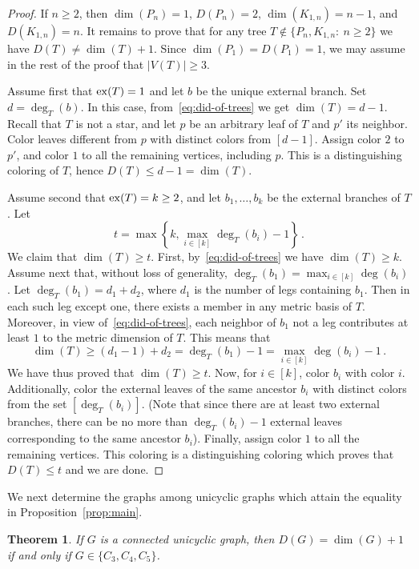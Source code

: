 \documentclass[12pt]{article}
\newtheorem{theorem}{Theorem}[section]
\DeclareMathOperator {\ex} {{\rm ex}}
\begin{document}
\begin{proof}
If $n\ge 2$, then $\dim(P_n) = 1$, $D(P_n) = 2$, $\dim(K_{1,n}) = n-1$, and $D(K_{1,n}) = n$. It remains to prove that for any tree $T \notin\{P_n, K_{1,n}:\ n\ge 2\}$ we have $D(T) \ne \dim(T)+1$. Since $\dim(P_1) = D(P_1) = 1$, we may assume in the rest of the proof that $|V(T)|\ge 3$. 

Assume first that $\ex(T) = 1$ and let $b$ be the unique external branch. Set $d = \deg_T(b)$. In this case, from~\eqref{eq:did-of-trees} we get $\dim(T) = d-1$. Recall that $T$ is not a star, and let $p$ be an arbitrary leaf of $T$ and $p'$ its neighbor. Color leaves different from $p$ with distinct colors from $[d-1]$. Assign color $2$ to $p'$, and color $1$ to all the remaining vertices, including $p$. This is a distinguishing coloring of $T$, hence $D(T) \le d - 1 = \dim(T)$. 

Assume second that $\ex(T) = k\ge 2$, and let $b_1, \ldots, b_k$ be the external branches of $T$. Let 
$$t=\max \left\{k, \max_{i\in [k]} \deg_T (b_i) - 1 \right\}\,.$$ 
We claim that $\dim(T)\ge t$. First, by~\eqref{eq:did-of-trees} we have $\dim(T)\ge k$. Assume next that, without loss of generality, $\deg_T (b_1) = \max_{i\in [k]} \deg (b_i)$. Let $\deg_T (b_1) = d_1 + d_2$, where $d_1$ is the number of legs containing $b_1$. Then in each such leg except one, there exists a member in any metric basis of $T$. Moreover, in view of~\eqref{eq:did-of-trees}, each neighbor of $b_1$ not a leg contributes at least $1$ to the metric dimension of $T$. This means that 
$$\dim(T) \ge (d_1 - 1) + d_2 = \deg_T (b_1) - 1 = \max_{i\in [k]} \deg (b_i) - 1\,.$$ 
We have thus proved that $\dim(T)\ge t$. Now, for $i\in [k]$, color $b_i$ with color $i$. Additionally, color the external leaves of the same ancestor $b_i$ with distinct colors from the set $[\deg_T(b_i)]$.  
(Note that since there are at least two external branches, there can be no more than $\deg_T(b_i)-1$ external leaves corresponding to the same ancestor $b_i$). Finally, assign color $1$ to all the remaining vertices. This coloring is a distinguishing coloring which proves that $D(T) \leq t$ and we are done. 
\end{proof} 

We next determine the graphs among unicyclic graphs which attain the equality in Proposition~\ref{prop:main}.

\begin{theorem}
\label{thm:unicyclic}
If $G$ is a connected unicyclic graph, then $D(G) = \dim(G)+1$ if and only if $G \in \{C_3, C_4, C_5\}$.
\end{theorem}
\end{document}
